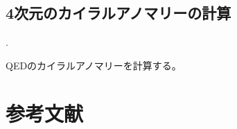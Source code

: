 \documentclass[
  unicode,a4paper,10pt,
  xcolor = {dvipsnames,svgnames},
  hyperref ={colorlinks=true,citecolor=Navy,linkcolor=NavyBlue,urlcolor=purple},
  ja=standard,lualatex
]{beamer}
\begin{document}
\subsection{4次元のカイラルアノマリーの計算}


\begin{frame}{\thesubsection. \subsecname}

  QEDのカイラルアノマリーを計算する。
  

\end{frame}


\section{参考文献}
\begin{frame}{\secname}

  \scriptsize
  \beamertemplatetextbibitems
  
  

\end{frame}

\setcounter{framenumber}{\value{Appendix}}
\end{document}
